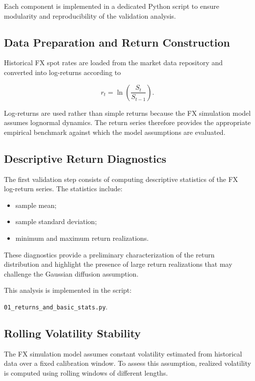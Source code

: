 Each component is implemented in a dedicated Python script to ensure modularity and reproducibility of the validation analysis.

\subsection{Data Preparation and Return Construction}

Historical FX spot rates are loaded from the market data repository and converted into log-returns according to

\[
r_t = \ln\left(\frac{S_t}{S_{t-1}}\right).
\]

Log-returns are used rather than simple returns because the FX simulation model assumes lognormal dynamics. The return series therefore provides the appropriate empirical benchmark against which the model assumptions are evaluated.

\subsection{Descriptive Return Diagnostics}

The first validation step consists of computing descriptive statistics of the FX log-return series. The statistics include:

\begin{itemize}
	
	\item sample mean;
	\item sample standard deviation;
	\item minimum and maximum return realizations.
	
\end{itemize}

These diagnostics provide a preliminary characterization of the return distribution and highlight the presence of large return realizations that may challenge the Gaussian diffusion assumption.

This analysis is implemented in the script:

\texttt{01\_returns\_and\_basic\_stats.py}.

\subsection{Rolling Volatility Stability}

The FX simulation model assumes constant volatility estimated from historical data over a fixed calibration window. To assess this assumption, realized volatility is computed using rolling windows of different lengths.

